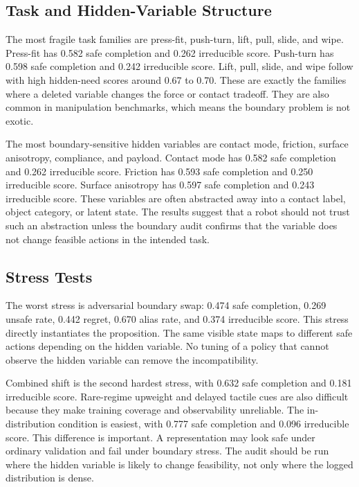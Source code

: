 \documentclass{article}
\begin{document}
\subsection{Task and Hidden-Variable Structure}



The most fragile task families are press-fit, push-turn, lift, pull, slide, and
wipe. Press-fit has 0.582 safe completion and 0.262 irreducible score. Push-turn
has 0.598 safe completion and 0.242 irreducible score. Lift, pull, slide, and
wipe follow with high hidden-need scores around 0.67 to 0.70. These are exactly
the families where a deleted variable changes the force or contact tradeoff.
They are also common in manipulation benchmarks, which means the boundary
problem is not exotic.



The most boundary-sensitive hidden variables are contact mode, friction, surface
anisotropy, compliance, and payload. Contact mode has 0.582 safe completion and
0.262 irreducible score. Friction has 0.593 safe completion and 0.250
irreducible score. Surface anisotropy has 0.597 safe completion and 0.243
irreducible score. These variables are often abstracted away into a contact label,
object category, or latent state. The results suggest that a robot should not
trust such an abstraction unless the boundary audit confirms that the variable
does not change feasible actions in the intended task.

\subsection{Stress Tests}



The worst stress is adversarial boundary swap: 0.474 safe completion, 0.269
unsafe rate, 0.442 regret, 0.670 alias rate, and 0.374 irreducible score. This
stress directly instantiates the proposition. The same visible state maps to
different safe actions depending on the hidden variable. No tuning of a policy
that cannot observe the hidden variable can remove the incompatibility.

Combined shift is the second hardest stress, with 0.632 safe completion and 0.181
irreducible score. Rare-regime upweight and delayed tactile cues are also
difficult because they make training coverage and observability unreliable. The
in-distribution condition is easiest, with 0.777 safe completion and 0.096
irreducible score. This difference is important. A representation may look safe
under ordinary validation and fail under boundary stress. The audit should be run
where the hidden variable is likely to change feasibility, not only where the
logged distribution is dense.
\end{document}
